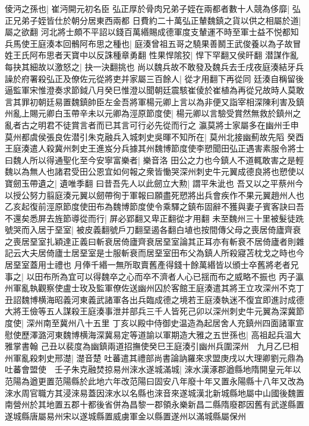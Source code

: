 倰沔之孫也|{
	崔沔開元初名臣}
弘正厚於骨肉兄弟子姪在兩都者數十人競為侈靡|{
	弘正兄弟子姪皆仕於朝分居東西兩都}
日費約二十萬弘正輦魏鎮之貨以供之相屬於道|{
	屬之欲翻}
河北將士頗不平詔以錢百萬緡賜成德軍度支輦運不時至軍士益不悦都知兵馬使王庭湊本回鶻阿布思之種也|{
	庭湊曾祖五哥之驍果善鬭王武俊養以為子故冒姓王氏阿布思者天寶中以反誅種章勇翻}
性果悍隂狡|{
	悍下罕翻又侯旰翻}
潜謀作亂每抉其細故以激怒之|{
	抉一決翻挑也}
尚以魏兵故不敢發及魏兵去壬戌夜庭湊結牙兵譟於府署殺弘正及僚佐元從將吏并家屬三百餘人|{
	從才用翻下再從同}
廷湊自稱留後逼監軍宋惟澄奏求節鉞八月癸巳惟澄以聞朝廷震駭崔倰於崔植為再從兄故時人莫敢言其罪初朝廷易置魏鎮帥臣左金吾將軍楊元卿上言以為非便又詣宰相深陳利害及鎮州亂上賜元卿白玉帶辛未以元卿為涇原節度使|{
	楊元卿以言驗受賞然無救於鎮州之亂者古之明君不徒賞言者而已其言可行必先從而行之}
瀛莫將士家屬多在幽州壬申莫州都虞侯張良佐潜引朱克融兵入城刺史吳暉不知所在|{
	莫州北接幽薊故先䧟}
癸酉王庭湊遣人殺冀州刺史王進岌分兵據其州魏博節度使李愬聞田弘正遇害素服令將士曰魏人所以得通聖化至今安寧富樂者|{
	樂音洛}
田公之力也今鎮人不道輒敢害之是輕魏以為無人也諸君受田公恩宜如何報之衆皆慟哭深州刺史牛元翼成德良將也愬使以寶劒玉帶遺之|{
	遺唯季翻}
曰昔吾先人以此劒立大勲|{
	謂平朱泚也}
吾又以之平蔡州今以授公努力翦庭湊元翼以劒帶徇于軍報曰願盡死愬將出兵會疾作不果元翼趙州人也乙亥起復前涇原節度使田布為魏博節度使令乘驛之鎮布固辭不獲與妻子賓客訣曰吾不還矣悉屏去旌節導從而行|{
	屏必郢翻又卑正翻從才用翻}
未至魏州三十里被髮徒跣號哭而入居于堊室|{
	被皮義翻號戶刀翻堊遏各翻白埴也按間傳父母之喪居倚廬齊衰之喪居堊室扎穎達正義曰斬衰居倚廬齊衰居堊室論其正耳亦有斬衰不居倚廬者則雜記云大夫居倚廬士居堊室是士服斬衰而居堊室田布父為鎮人所殺寢苫枕戈之時也今居堊室蓋用士禮也}
月俸千緡一無所取賣舊產得錢十餘萬緡皆以頒士卒舊將老者兄事之|{
	以田布所為宜可以得魏卒之心而卒不濟者人心已揺而布之威略不振也}
丙子瀛州軍亂執觀察使盧士玫及監軍僚佐送幽州囚於客館王庭湊遣其將王立攻深州不克丁丑詔魏博横海昭義河東義武諸軍各出兵臨成德之境若王庭湊執迷不復宜即進討成德大將王儉等五人謀殺王庭湊事泄并部兵三千人皆死己卯以深州刺史牛元翼為深冀節度使|{
	深州南至冀州八十五里}
丁亥以殿中侍御史温造為起居舍人充鎮州四面諸軍宣慰使歷澤潞河東魏博横海深冀易定等道諭以軍期造大雅之五世孫也|{
	高祖起兵温大雅掌書翰}
己丑以裴度為幽鎮兩道招撫使癸巳王庭湊引幽州兵圍深州　九月乙巳相州軍亂殺刺史邢濋|{
	濋音楚}
吐蕃遣其禮部尚書論訥羅來求盟庚戌以大理卿劉元鼎為吐蕃會盟使　壬子朱克融焚掠易州淶水遂城滿城|{
	淶水漢涿郡遒縣地隋開皇元年以范陽為遒更置范陽縣於此地六年改范陽曰固安八年廢十年又置永陽縣十八年又改為淶水周官職方其浸淶易蓋因淶水以名縣也淶音來遂城漢北新城縣地屬中山國後魏置南營州於其地置五郡十都後省併為昌黎一郡領永樂新昌二縣隋廢郡因舊有武遂縣置遂城縣唐屬易州宋以遂城縣置威虜軍金以縣置遂州以滿城縣屬保州}
